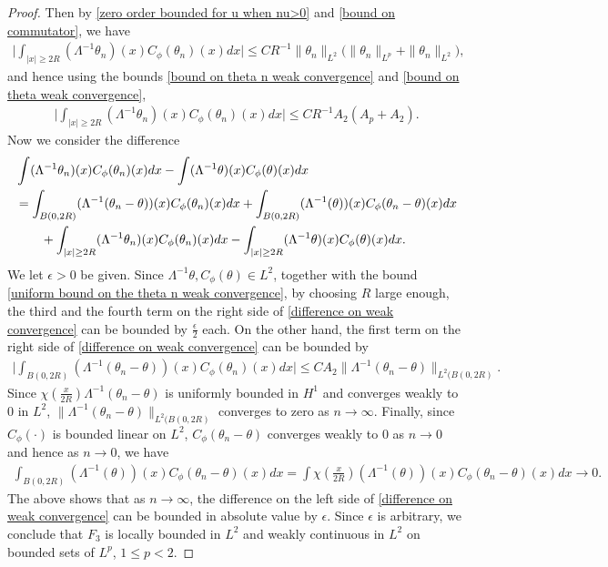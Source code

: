\documentclass[reqno]{amsart}%
\theoremstyle{definition}
\theoremstyle{remark}
\numberwithin{equation}{section}
\newcommand{\1}{\mathbf{1}}
\numberwithin{equation}{section}
\numberwithin{theorem}{section}
\numberwithin{figure}{section}
\begin{document}
\begin{proof}
Then by \eqref{zero order bounded for u when nu>0} and \eqref{bound on commutator}, we have
\begin{align*}
\Big|\int_{|x|\ge 2R}(\Lambda^{-1}\theta_n)(x)C_{\phi}(\theta_n)(x)dx\Big|\le CR^{-1}\|\theta_n\|_{L^2}\Big(\|\theta_n\|_{L^p}+\|\theta_n\|_{L^2}\Big),
\end{align*}
and hence using the bounds \eqref{bound on theta n weak convergence} and \eqref{bound on theta weak convergence},
\begin{align}\label{uniform bound on the theta n weak convergence}
\Big|\int_{|x|\ge 2R}(\Lambda^{-1}\theta_n)(x)C_{\phi}(\theta_n)(x)dx\Big|\le CR^{-1}A_2(A_p+A_2).
\end{align}
Now we consider the difference
\begin{align}\label{difference on weak convergence}
&\int(\Lambda^{-1}\theta_n)(x)C_{\phi}(\theta_n)(x)dx-\int(\Lambda^{-1}\theta)(x)C_{\phi}(\theta)(x)dx\\
&=\int_{B(0,2R)}(\Lambda^{-1}(\theta_n-\theta))(x)C_{\phi}(\theta_n)(x)dx+\int_{B(0,2R)}(\Lambda^{-1}(\theta))(x)C_{\phi}(\theta_n-\theta)(x)dx\notag\\
&\qquad+\int_{|x|\ge2R}(\Lambda^{-1}\theta_n)(x)C_{\phi}(\theta_n)(x)dx-\int_{|x|\ge2R}(\Lambda^{-1}\theta)(x)C_{\phi}(\theta)(x)dx.\notag
\end{align}
We let $\epsilon>0$ be given. Since $\Lambda^{-1}\theta,C_{\phi}(\theta)\in L^2$, together with the bound \eqref{uniform bound on the theta n weak convergence}, by choosing $R$ large enough, the third and the fourth term on the right side of \eqref{difference on weak convergence} can be bounded by $\frac{\epsilon}{2}$ each. On the other hand, the first term on the right side of \eqref{difference on weak convergence} can be bounded by
\begin{align*}
\Big|\int_{B(0,2R)}(\Lambda^{-1}(\theta_n-\theta))(x)C_{\phi}(\theta_n)(x)dx\Big|\le CA_2\|\Lambda^{-1}(\theta_n-\theta)\|_{L^2(B(0,2R)}.
\end{align*}
Since $\chi(\frac{x}{2R})\Lambda^{-1}(\theta_n-\theta)$ is uniformly bounded in $H^1$ and converges weakly to $0$ in $L^2$, $\|\Lambda^{-1}(\theta_n-\theta)\|_{L^2(B(0,2R)}$ converges to zero as $n\to\infty$. Finally, since $C_\phi(\cdot)$ is bounded linear on $L^2$, $C_{\phi}(\theta_n-\theta)$ converges weakly to 0 as $n\to0$ and hence as $n\to0$, we have
\begin{align*}
\int_{B(0,2R)}(\Lambda^{-1}(\theta))(x)C_{\phi}(\theta_n-\theta)(x)dx=\int\chi(\frac{x}{2R})(\Lambda^{-1}(\theta))(x)C_{\phi}(\theta_n-\theta)(x)dx\to0.
\end{align*}
The above shows that as $n\to\infty$, the difference on the left side of \eqref{difference on weak convergence} can be bounded in absolute value by $\epsilon$. Since $\epsilon$ is arbitrary, we conclude that $F_3$ is locally bounded in $L^2$ and weakly continuous in $L^2$ on bounded sets of $L^p$, $1\le p<2$.
\end{proof}
\end{document}
